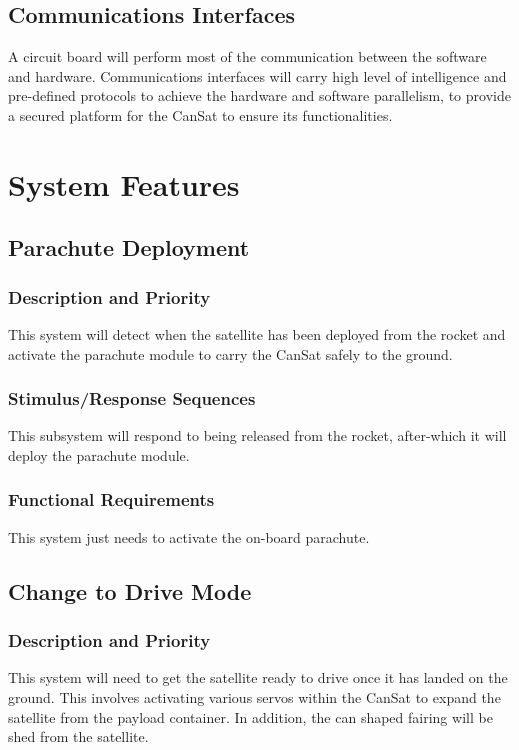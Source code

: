 \documentclass{scrreprt}
\begin{document}
\section{Communications Interfaces}
A circuit board will perform most of the communication between the software and hardware. Communications interfaces will carry high level of intelligence and pre-defined protocols to achieve the hardware and software parallelism, to provide a secured platform for the CanSat to ensure its functionalities. 

\chapter{System Features}


\section{Parachute Deployment}


\subsection{Description and Priority}
This system will detect when the satellite has been deployed from the rocket and activate the parachute module to carry the CanSat safely to the ground.


\subsection{Stimulus/Response Sequences}
This  subsystem will respond to being released from the rocket, after-which it will deploy the parachute module.

\subsection{Functional Requirements}
This system just needs to activate the on-board parachute.


\section{Change to Drive Mode}

\subsection{Description and Priority}
This system will need to get the satellite ready to drive once it has landed on the ground. This involves activating various servos within the CanSat to expand the satellite from the payload container. In addition, the can shaped fairing will be shed from the satellite. 
\end{document}
